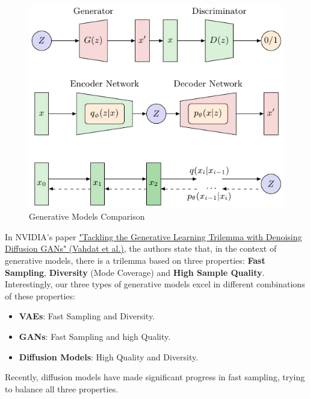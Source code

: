 \begin{figure}[!htbp]
    \centering
    \includegraphics[width=\linewidth]{tikz/chapter10 - Generative Models Comparison.pdf}
    \caption{Generative Models Comparison}
\end{figure}



In NVIDIA's paper \href{https://arxiv.org/pdf/2112.07804}{"Tackling the Generative Learning Trilemma with Denoising Diffusion GANs" (Vahdat et al.)}, the authors state that, in the context of generative models, there is a trilemma based on three properties: \textbf{Fast Sampling}, \textbf{Diversity} (Mode Coverage) and \textbf{High Sample Quality}. Interestingly, our three types of generative models excel in different combinations of these properties:

\begin{itemize}
    \item \textbf{VAEs}: Fast Sampling and Diversity.
    \item \textbf{GANs}: Fast Sampling and high Quality.
    \item \textbf{Diffusion Models}: High Quality and Diversity.
\end{itemize}

Recently, diffusion models have made significant progress in fast sampling, trying to balance all three properties.


